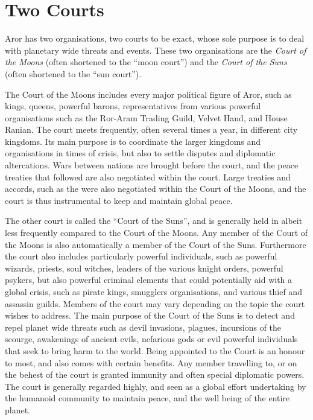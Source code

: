 \section{Two Courts}
\label{sec:Two Courts}

Aror has two organisations, two courts to be exact, whose sole purpose is to
deal with planetary wide threats and events. These two organisations are the
\emph{Court of the Moons} (often shortened to the ``moon court'') and the
\emph{Court of the Suns} (often shortened to the ``sun court'').

The Court of the Moons includes every major political figure of Aror, such as
kings, queens, powerful barons, representatives from various powerful
organisations such as the Ror-Aram Trading Guild, Velvet Hand, and House
Ranian.  The court meets frequently, often several times a year, in different
city kingdoms. Its main purpose is to coordinate the larger kingdoms and
organisations in times of crisis, but also to settle disputes and diplomatic
altercations. Wars between nations are brought before the court, and the peace
treaties that followed are also negotiated within the court. Large treaties
and accords, such as the  were also negotiated
within the Court of the Moons, and the court is thus instrumental to keep and
maintain global peace.

The other court is called the ``Court of the Suns'', and is generally held in
 albeit less frequently compared to the Court of
the Moons. Any member of the Court of the Moons is also automatically a member
of the Court of the Suns. Furthermore the court also includes particularly
powerful individuals, such as powerful wizards, priests, soul witches, leaders
of the various knight orders, powerful psykers, but also powerful criminal
elements that could potentially aid with a global crisis, such as pirate
kings, smugglers organisations, and various thief and assassin guilds. Members
of the court may vary depending on the topic the court wishes to address. The
main purpose of the Court of the Suns is to detect and repel planet wide
threats such as devil invasions, plagues, incursions of the scourge,
awakenings of ancient evils, nefarious gods or evil powerful individuals that
seek to bring harm to the world. Being appointed to the Court is an honour to
most, and also comes with certain benefits. Any member travelling to, or on
the behest of the court is granted immunity and often special diplomatic
powers. The court is generally regarded highly, and seen as a global effort
undertaking by the humanoid community to maintain peace, and the well being of
the entire planet.
